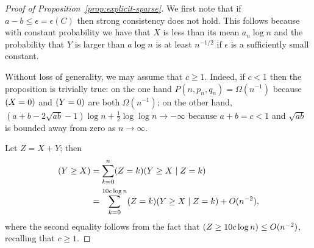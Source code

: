 \documentclass[EJP]{ejpecp}
\newcommand{\1}[1]{\mathbbm{1}_{\{#1\}}}
\newcommand{\eps}{\epsilon}
\let\Pr\relax
\DeclareMathOperator{\Pr}{Pr}
\begin{document}
\begin{proof}[Proof of Proposition~\ref{prop:explicit-sparse}]
We first note that if $a - b \leq \epsilon = \epsilon(C)$ then strong consistency does
not hold. This follows because with constant probability we have that $X$
is less than its mean $a_n \log n$ and the probability that $Y$ is larger than
$a \log n$ is at least $n^{-1/2}$ if $\eps$ is a sufficiently small constant.

Without loss of generality, we may assume that $c \ge 1$. Indeed,
if $c < 1$ then the proposition is trivially true:
on the one hand $P(n, p_n, q_n) = \Omega(n^{-1})$
because $\Pr(X = 0)$ and $\Pr(Y = 0)$ are both $\Omega(n^{-1})$;
on the other hand, $(a + b - 2\sqrt{ab} - 1) \log n + \frac 12 \log \log n
\to -\infty$ because $a + b = c < 1$ and $\sqrt{ab}$ is bounded away from zero as $n \to \infty$.

Let $Z = X+Y$; then
\begin{align*}
\Pr(Y \geq X) &= \sum_{k = 0}^n \Pr(Z = k) \Pr(Y \geq X \mid Z = k)\\
&= \sum_{k = 0}^{10 c \log n} \Pr(Z = k) \Pr(Y \geq X \mid Z = k) + O(n^{-2}),
\end{align*}
where the second equality follows from the fact that $\Pr(Z \geq 10 c \log n) \leq O(n^{-2})$,
recalling that $c \geq 1$.


\end{proof}
\end{document}
